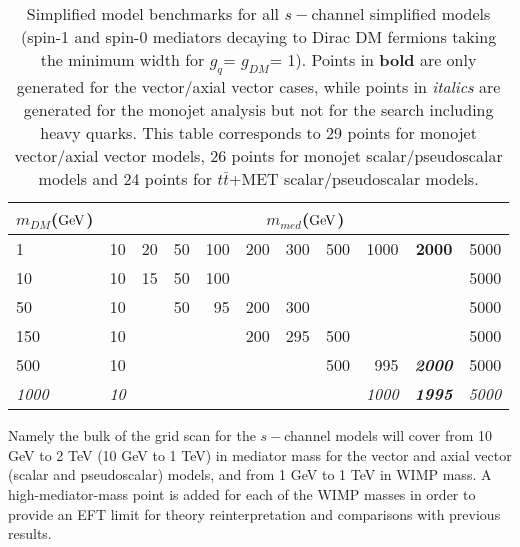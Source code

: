 \documentclass[a4,debug,notitlepage,nobib]{tufte-handout}
\newcommand{\mdm}{\ensuremath{m_{DM}}\xspace}
\newcommand{\mmed}{\ensuremath{m_{med}}\xspace}
\newcommand{\gq}{\ensuremath{g_{q}}\xspace}
\newcommand{\gdm}{\ensuremath{g_{DM}}\xspace}
\begin{document}
\begin{table}[!h]
\centering
\begin{tabular}{| l |r r r r r r r r r r|}
\hline
\multicolumn{1}{|c|}{\mdm (${\rm GeV}$)} & \multicolumn{10}{c|}{\mmed (${\rm GeV}$)} \\
\hline
 1             &         10  & 20 & 50 & 100 & 200 & 300 & 500 &         1000  & \textbf{2000}          &         5000  \\

 10   	       &         10  & 15 & 50 & 100 &     &     &     &               &                        &         5000  \\
 50            &         10  &    & 50 &  95 & 200 & 300 &     &               &                        &         5000  \\
 150           &         10  &    &    &     & 200 & 295 & 500 &               &                        &         5000  \\
 500           &         10  &    &    &     &     &     & 500 &          995  & \textbf{\textit{2000}} &         5000  \\
 \textit{1000} & \textit{10} &    &    &     &     &     &     & \textit{1000} & \textbf{\textit{1995}} & \textit{5000}  \\
\hline
\end{tabular}

\caption{Simplified model benchmarks for all $s-$channel simplified models (spin-1 and spin-0 mediators 
decaying to Dirac DM fermions taking the minimum width for \gq = \gdm = 1).
Points in \textbf{bold} are only generated for the vector/axial vector cases, while points in 
\textit{italics} are generated for the monojet analysis 
but not for the search including heavy quarks. This table corresponds to 29 points for monojet vector/axial vector models,
26 points for monojet scalar/pseudoscalar models and 24 points for $t \bar{t}$+MET scalar/pseudoscalar models.}

\label{tab:parameterScanGeneralModels}
\end{table}

Namely the bulk of the grid scan for
the $s-$channel models will cover from 10 GeV to 2 TeV (10 GeV to 1 TeV)
in mediator mass for the vector and axial vector (scalar and pseudoscalar) models,
and from 1 GeV to 1 TeV in WIMP mass. A high-mediator-mass point is added for 
each of the WIMP masses in order to provide an EFT limit for theory reinterpretation
and comparisons with previous results. 
\end{document}
